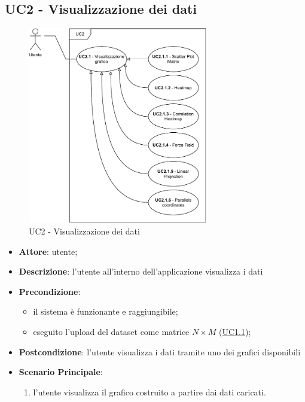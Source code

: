 \subsection{UC2 - Visualizzazione dei dati}
\label{uc2}

    \begin{figure}[htbp]
        \centering
        \includegraphics[width=0.7\textwidth]{source/sections/casi-uso/diagrams/uc2.pdf}
        \caption{UC2 - Visualizzazione dei dati}
        \label{fig:uc2}
    \end{figure}

    \begin{itemize}
    \item \textbf{Attore}: utente;
    \item \textbf{Descrizione}: l'utente all'interno dell'applicazione visualizza i dati
    \item \textbf{Precondizione}:
    \begin{itemize}
        \item il sistema è funzionante e raggiungibile;
        \item eseguito l'upload del dataset come matrice $N\times M$ (\hyperref[uc1.1]{UC1.1});
    \end{itemize}
    \item \textbf{Postcondizione}: l'utente visualizza i dati tramite uno dei grafici disponibili
    \item \textbf{Scenario Principale}: 
        \begin{enumerate}
            \item l'utente visualizza il grafico costruito a partire dai dati caricati.
        \end{enumerate}  
    \end{itemize}
    
